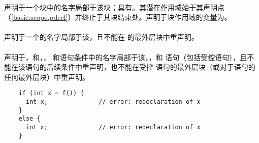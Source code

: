 \paragraph{} %
声明于一个块中的名字局部于该块；具有。其潜在作用域始于其声明点
（\ref{basic.scope.pdecl}）并终止于其块结束处。声明于块作用域的变量为。

\paragraph{} %
声明于一个的名字局部于该，且不能在
的最外层块中重声明。

\paragraph{} %
声明于，和，，
和语句条件中的名字局部于该，，和
语句（包括受控语句），且不能在该语句的后续条件中重声明，也不能在受控
语句的最外层块（或对于语句的任何最外层块）中重声明。

\begin{example}
  \begin{lstlisting}
    if (int x = f()) {
      int x;              // error: redeclaration of x
    }
    else {
      int x;              // error: redeclaration of x
    }
  \end{lstlisting}
\end{example}
